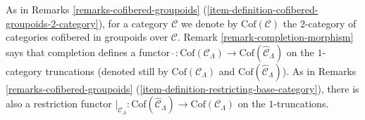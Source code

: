 \begin{remark}
\label{remark-completion-restriction-adjoint}
As in
Remarks \ref{remarks-cofibered-groupoids}
(\ref{item-definition-cofibered-groupoids-2-category}),
for a category $\mathcal{C}$ 
we denote by $\text{Cof}(\mathcal{C})$ the 2-category of categories 
cofibered in groupoids over $\mathcal{C}$. Remark 
\ref{remark-completion-morphism} says that completion defines a functor 
$\widehat{~}: \text{Cof}(\mathcal{C}_\Lambda) \to 
\text{Cof}(\widehat{\mathcal{C}}_\Lambda)$ on the $1$-category 
truncations (denoted still by $\text{Cof}(\mathcal{C}_\Lambda)$ and 
$\text{Cof}(\widehat{\mathcal{C}}_\Lambda)$).  As in
Remarks \ref{remarks-cofibered-groupoids}
(\ref{item-definition-restricting-base-category}), 
there is also a restriction functor $|_{\mathcal{C}_\Lambda}: 
\text{Cof}(\widehat{\mathcal{C}}_\Lambda) \to 
\text{Cof}(\mathcal{C}_\Lambda)$ on the $1$-truncations.  


\end{remark}
